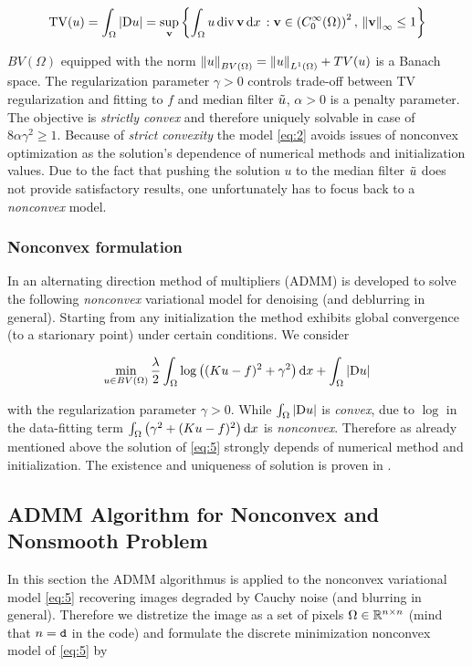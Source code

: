 \begin{equation}
    \TV(u) = \int_\Omega \abs{\Gdiff u} = \sup_{\vec{v}} \left\{ \int_\Omega u \div{\vec{v}} \diff x \, : \vec{v} \in \left(C_0^\infty(\Omega)\right)^2, \, \norm{\vec{v}}_\infty \leq 1\right\}
\end{equation}

$BV(\Omega)$ equipped with the norm $\left\lVert u\right\rVert_{BV(\Omega)} = \left\lVert u\right\rVert_{L^1(\Omega)} + TV(u)$ is a Banach space. The regularization parameter $\gamma > 0$ controls trade-off between TV regularization and fitting to $f$ and median filter $\Tilde{u}$, $\alpha > 0$ is a penalty parameter. The objective is \textit{strictly convex} and therefore uniquely solvable in case of $8 \alpha \gamma^2 \geq 1$. Because of \textit{strict convexity} the model \ref{eq:2} avoids issues of nonconvex optimization as the solution's dependence of numerical methods and initialization values. Due to the fact that pushing the solution $u$ to the median filter $\Tilde{u}$ does not provide satisfactory results, one unfortunately has to focus back to a \textit{nonconvex} model.

\subsubsection{Nonconvex formulation}
In \cite{MR3761275} an alternating direction method of multipliers (ADMM) is developed to solve the following \textit{nonconvex} variational model for denoising (and deblurring in general). Starting from any initialization the method exhibits global convergence (to a starionary point) under certain conditions. We consider

\begin{equation} \label{eq:5}
\min_{u \in BV(\Omega)} \frac{\lambda}{2} \int_\Omega \log \left((K u - f)^2 + \gamma^2 \right) \mathop{}\!\mathrm{d} x + \int_\Omega \abs{{\mathop{}\!\mathrm{D} u}}
\end{equation}

with the regularization parameter $\gamma > 0$. While $\int_\Omega \abs{\mathop{}\!\mathrm{D} u}$ is \textit{convex}, due to $\log$ in the data-fitting term $\int_\Omega \left(\gamma^2 + (K u - f)^2\right) \mathop{}\!\mathrm{d} x$ is \textit{nonconvex}. Therefore as already mentioned above the solution of \ref{eq:5} strongly depends of numerical method and initialization. The existence and uniqueness of solution is proven in \cite[3.2]{MR3761275}.

\subsection{ADMM Algorithm for Nonconvex and Nonsmooth Problem}
In this section the ADMM algorithmus is applied to the nonconvex variational model \ref{eq:5} recovering images degraded by Cauchy noise (and blurring in general).
Therefore we distretize the image as a set of pixels $\Omega \in \mathbb{R}^{n \times n}$ (mind that $n = \texttt{d}$ in the code) and formulate the discrete minimization nonconvex model of \ref{eq:5} by

